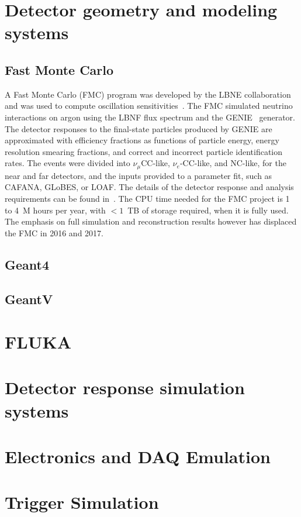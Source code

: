 \section{Detector geometry and modeling systems}


\subsection{Fast Monte Carlo}

A Fast Monte Carlo (FMC) program was developed by the LBNE collaboration and was used to
compute oscillation sensitivities~\cite{cdr-vol-2}.  The FMC simulated neutrino interactions
on argon using the LBNF flux spectrum and the GENIE~\cite{GENIE} generator.  The detector
responses to the final-state particles produced by GENIE are approximated with efficiency
fractions as functions of particle energy, energy resolution smearing fractions, and
correct and incorrect particle identification rates.  The events were divided into
$\nu_\mu$CC-like, $\nu_e$-CC-like, and NC-like, for the near and far detectors, and the
inputs provided to a parameter fit, such as CAFANA, GLoBES, or LOAF.  The details of the
detector response and analysis requirements can be found in~\cite{cdr-vol-2}.  The CPU time needed
for the FMC project is 1 to 4~M hours per year, with $<1$~TB of storage required, when
it is fully used.  The emphasis on full simulation and reconstruction results however has
displaced the FMC in 2016 and 2017. 

\subsection{Geant4}

\subsection{GeantV}

\section{FLUKA}

\section{Detector response simulation systems}

\section{Electronics and DAQ Emulation}

\section{Trigger Simulation}
